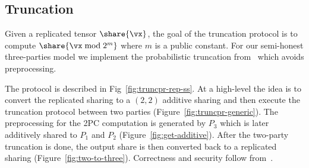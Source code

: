 \subsection{Truncation}
\label{subsec:truncation}

Given a replicated tensor $\share{\vx}$, the goal of the truncation protocol is to compute $\share{\vx \bmod 2^m}$ where $m$ is a public constant.
For our semi-honest three-parties model we implement the probabilistic truncation from~\cite{PoPETS:DalEscKel20} which avoids preprocessing.

The protocol is described in Fig~\ref{fig:truncpr-rep-ss}. At a high-level the idea is to convert the replicated sharing to a $(2,2)$ additive sharing and then execute the truncation protocol between two parties (Figure~\ref{fig:truncpr-generic}). The preprocessing for the 2PC computation is generated by $P_3$ which is later additively shared to $P_1$ and $P_2$ (Figure~\ref{fig:get-additive}). After the two-party truncation is done, the output share is then converted back to a replicated sharing (Figure~\ref{fig:two-to-three}). Correctness and security follow from~\cite{PoPETS:DalEscKel20}.



